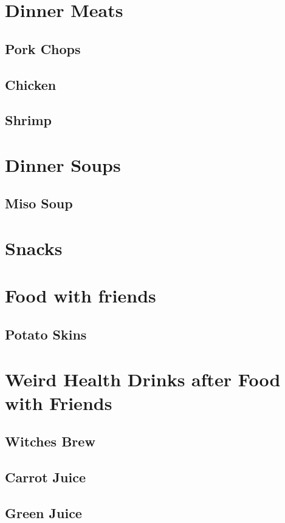 \documentclass{article}
\begin{document}
\section*{Dinner Meats}

\subsection*{Pork Chops}

\subsection*{Chicken}

\subsection*{Shrimp}

\section{Dinner Soups} 

\subsection*{Miso Soup}


\section*{Snacks}


\section*{Food with friends}

\subsection*{Potato Skins} 

\section*{Weird Health Drinks after Food with Friends}

\subsection*{Witches Brew} 

\subsection*{Carrot Juice} 

\subsection*{Green Juice}
\end{document}
